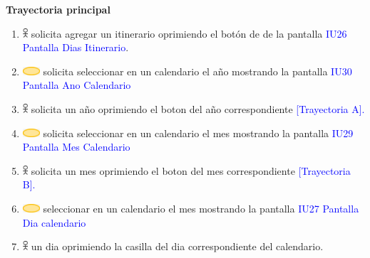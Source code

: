\textbf{Trayectoria principal}
\begin{enumerate}

\item \includegraphics[width=0.0150\textwidth]{Figuras/persona.png} solicita agregar un itinerario oprimiendo el botón de \textbf{\fbox{+}} de la pantalla \textcolor{blue}{IU26 Pantalla Dias Itinerario}.

\item \includegraphics[width=0.0500\textwidth]{Figuras/sistema.png} solicita seleccionar en un calendario el año mostrando la pantalla \textcolor{blue}{IU30 Pantalla Ano Calendario}

\item \includegraphics[width=0.0150\textwidth]{Figuras/persona.png} solicita un año oprimiendo el boton  del año correspondiente \textcolor{blue}{[Trayectoria A].}

\item \includegraphics[width=0.0500\textwidth]{Figuras/sistema.png} solicita seleccionar en un calendario el mes mostrando la pantalla \textcolor{blue}{IU29 Pantalla Mes Calendario}

\item \includegraphics[width=0.0150\textwidth]{Figuras/persona.png} solicita un mes oprimiendo el boton  del mes correspondiente \textcolor{blue}{[Trayectoria B].}

\item \includegraphics[width=0.0500\textwidth]{Figuras/sistema.png} seleccionar en un calendario el mes mostrando la pantalla \textcolor{blue}{IU27 Pantalla Dia calendario}

\item \includegraphics[width=0.0150\textwidth]{Figuras/persona.png} un dia oprimiendo la casilla  del dia correspondiente del calendario.


\end{enumerate}
